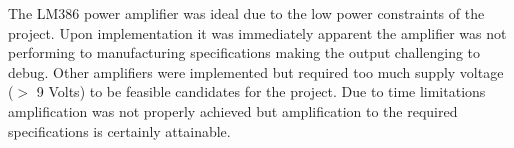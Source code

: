 	The LM386 power amplifier was ideal due to the low power constraints of the project.  Upon implementation it was immediately apparent the amplifier was not performing to manufacturing specifications making the output challenging to debug. Other amplifiers were implemented but required too much supply voltage ($>$ 9 Volts) to be feasible candidates for the project.  Due to time limitations amplification was not properly achieved but amplification to the required specifications is certainly attainable. 




